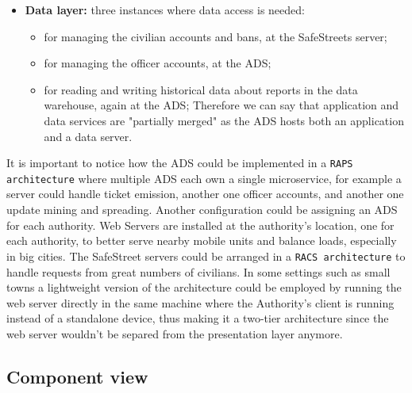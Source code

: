 \documentclass[12pt,a4paper]{article}
\begin{document}
\begin{itemize}
\item \textbf{Data layer:} three instances where data access is needed:
\begin{itemize}
\item for managing the civilian accounts and bans, at the SafeStreets server;
\item for managing the officer accounts, at the ADS;
\item for reading and writing historical data about reports in the data warehouse, again at the ADS;
Therefore we can say that application and data services are "partially merged" as the ADS hosts both an application and a data server.
\end{itemize}
\end{itemize}

It is important to notice how the ADS could be implemented in a \texttt{RAPS architecture} where multiple ADS each own a single microservice, for example a server could handle ticket emission, another one officer accounts, and another one update mining and spreading. Another configuration could be assigning an ADS for each authority. 
Web Servers are installed at the authority's location, one for each authority, to better serve nearby mobile units and balance loads, especially in big cities.
The SafeStreet servers could be arranged in a \texttt{RACS architecture} to handle requests from great numbers of civilians.
In some settings such as small towns a lightweight version of the architecture could be employed by running the web server directly in the same machine where the Authority's client is running instead of a standalone device, thus making it a two-tier architecture since the web server wouldn't be separed from the presentation layer anymore.


\newpage
\subsection{Component view}
\end{document}
